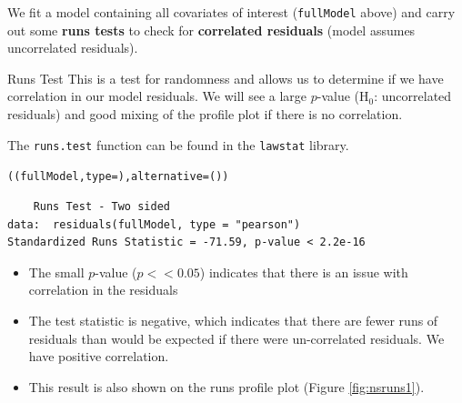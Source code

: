 \begin{knitrout}\footnotesize
{}\color{fgcolor}
\end{knitrout}


\begin{frame}[fragile]
We fit a model containing all covariates of interest ({\tt fullModel} above) and carry out some \textbf{runs tests} to check for \textbf{correlated residuals} (model assumes uncorrelated residuals).

\begin{block}{Runs Test}
This is a test for randomness and allows us to determine if we have correlation in our model residuals. We will see a large $p$-value (H$_0$: uncorrelated residuals) and good mixing of the profile plot if there is no correlation.
\end{block}

\end{frame}


\begin{frame}[fragile]
\noindent The {\tt runs.test} function can be found in the {\tt lawstat} library.
\begin{knitrout}\footnotesize
{}\color{fgcolor}\begin{kframe}
\begin{alltt}
((fullModel, type = ), alternative = ())
\end{alltt}
\begin{verbatim}
	Runs Test - Two sided
data:  residuals(fullModel, type = "pearson") 
Standardized Runs Statistic = -71.59, p-value < 2.2e-16
\end{verbatim}
\end{kframe}
\end{knitrout}

\begin{itemize}
\item The small $p$-value ($p << 0.05$) indicates that there is an issue with correlation in the residuals
\item The test statistic is negative, which indicates that there are fewer runs of residuals than would be expected if there were un-correlated residuals.  We have positive correlation.
\item This result is also shown on the runs profile plot (Figure \ref{fig:nsruns1}).
\end{itemize}
\end{frame}



